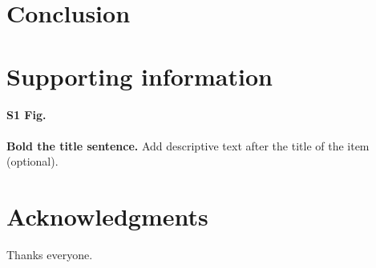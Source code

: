 \documentclass[10pt,letterpaper]{article}
\begin{document}
\section*{Conclusion}





\section*{Supporting information}

\paragraph*{S1 Fig.}
\label{S1_Fig}
{\bf Bold the title sentence.} Add descriptive text after the title of the item (optional).


\section*{Acknowledgments}
Thanks everyone.
\nolinenumbers

%
%
% 
 



\end{document}
